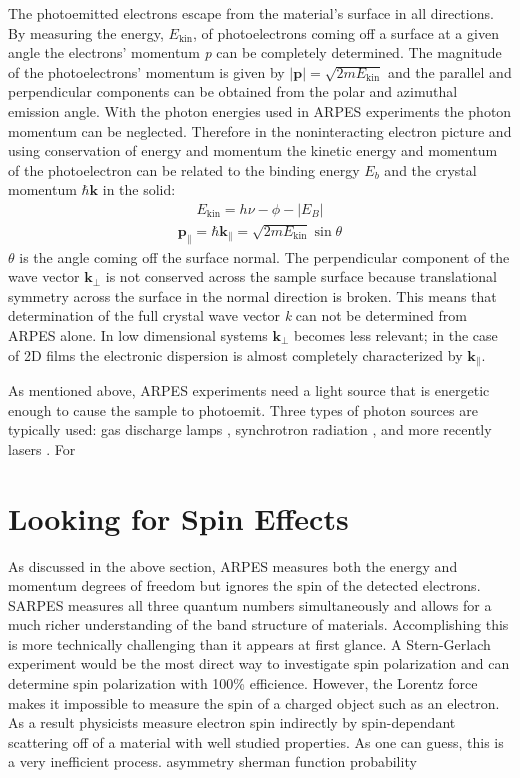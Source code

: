 \documentclass[12pt]{article}
\begin{document}
The photoemitted electrons escape from the material's surface in all directions.
By measuring the energy, $E_{\text{kin}}$, of photoelectrons coming off a surface at a given angle the electrons' momentum \emph{p} can be completely determined.
The magnitude of the photoelectrons' momentum is given by $|\boldsymbol{p}|=\sqrt{2mE_{\text{kin}}}$ and the parallel and perpendicular components can be obtained from the polar and azimuthal emission angle.
With the photon energies used in ARPES experiments the photon momentum can be neglected.
Therefore in the noninteracting electron picture and using conservation of energy and momentum the kinetic energy and momentum of the photoelectron can be related to the binding energy $E_b$ and the crystal momentum $\hbar\boldsymbol{k}$ in the solid\cite{Damascelli}:
\begin{align}
  E_{\text{kin}}=h\nu-\phi-|E_B|
\end{align}
\begin{align}
  \boldsymbol{p_{\parallel}}=\hbar\boldsymbol{k_{\parallel}}=\sqrt{2mE_{\text{kin}}}\sin\theta
\end{align}
$\theta$ is the angle coming off the surface normal.
The perpendicular component of the wave vector $\boldsymbol{k_{\perp}}$ is not conserved across the sample surface because translational symmetry across the surface in the normal direction is broken.  
This means that determination of the full crystal wave vector \emph{k} can not be determined from ARPES alone.
In low dimensional systems $\boldsymbol{k_{\perp}}$ becomes less relevant; in the case of 2D films the electronic dispersion is almost completely characterized by $\boldsymbol{k_{\parallel}}$.


As mentioned above, ARPES experiments need a light source that is energetic enough to cause the sample to photoemit.
Three types of photon sources are typically used:  gas discharge lamps \cite{Damascelli}, synchrotron radiation \cite{Damascelli}, and more recently lasers \cite{Dessau}.
For 



\section{Looking for Spin Effects}
As discussed in the above section, ARPES measures both the energy and momentum degrees of freedom but ignores the spin of the detected electrons.
SARPES measures all three quantum numbers simultaneously and allows for a much richer understanding of the band structure of materials.
Accomplishing this is more technically challenging than it appears at first glance.
A Stern-Gerlach experiment would be the most direct way to investigate spin polarization and can determine spin polarization with 100\% efficience.
However, the Lorentz force makes it impossible to measure the spin of a charged object such as an electron.
As a result physicists measure electron spin indirectly by spin-dependant scattering off of a material with well studied properties.
As one can guess, this is a very inefficient process.
asymmetry
sherman function
probability
\end{document}
